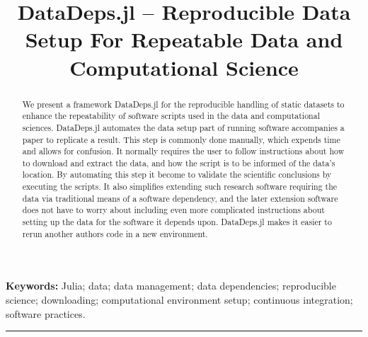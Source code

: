 \documentclass{jors}
\title{{DataDeps.jl -- Reproducible Data Setup For Repeatable Data and Computational Science}}
\author{}
\begin{document}
\maketitle

\begin{abstract}
We present a framework DataDeps.jl for the reproducible handling of static datasets to enhance the repeatability of software scripts used in the data and computational sciences.
DataDeps.jl automates the data setup part of running software accompanies a paper to replicate a result.
This step is commonly done manually, which expends time and allows for confusion.
It normally requires the user to follow instructions about how to download and extract the data, and how the script is to be informed of the data's location.
By automating this step it become to validate the scientific conclusions by executing the scripts.
It also simplifies extending such research software requiring the data via traditional means of a software dependency, and the later extension software does not have to worry about including even more complicated instructions about setting up the data for the software it depends upon.
DataDeps.jl makes it easier to rerun another authors code in a new environment.
\end{abstract}

\textbf{Keywords:} Julia; data; data management;  data dependencies; reproducible science; downloading; computational environment setup; continuous integration; software practices.


\rule{\textwidth}{1pt}


\begin{figure}
	
\end{figure}
\end{document}
